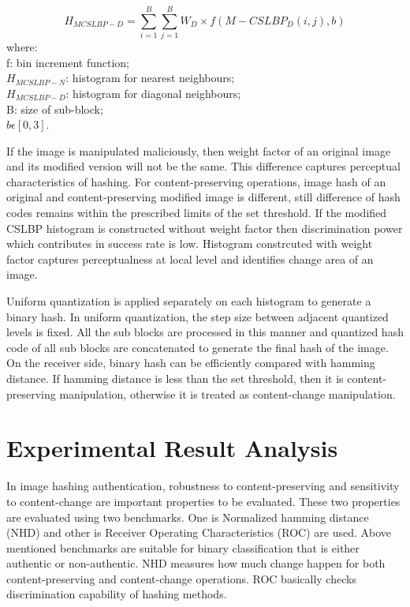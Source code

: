 \documentclass[12pt,a4paper]{jihmsp}
\begin{document}
{{\begin{equation}
H_{MCSLBP-D}=\sum_{i=1}^B\sum_{j=1}^BW_D \times f(M-CSLBP_{D}(i,j),b)
\end{equation}
where:\\
f: bin increment function;\\
$H_{MCSLBP-N}$: histogram for nearest neighbours; \\
$H_{MCSLBP-D}$: histogram for diagonal neighbours; \\
B: size of sub-block; \\
$b\epsilon[0,3]$. 
\par
If the image is manipulated maliciously, then weight factor of an original image and its modified version will not be the same. This difference captures perceptual characteristics of hashing. For content-preserving operations, image hash of an original and content-preserving modified image is different, still difference of hash codes remains within the prescribed limits of the set threshold. If the modified CSLBP histogram is constructed without weight factor then discrimination power which contributes in success rate is low. Histogram constrcuted with weight factor captures perceptualness at local level and identifies change area of an image.
\par
Uniform quantization is applied separately on each histogram to generate a binary hash. In uniform quantization, the step size between adjacent quantized levels is fixed. All the sub blocks are processed in this manner and quantized hash code of all sub blocks are concatenated to generate the final hash of the image. On the receiver side, binary hash can be efficiently compared with hamming distance. If hamming distance is less than the set threshold, then it is content-preserving manipulation, otherwise it is treated as content-change manipulation.

\section{Experimental Result Analysis}
In image hashing authentication, robustness to content-preserving and sensitivity to content-change are important properties to be evaluated. These two properties are evaluated using two benchmarks. One is Normalized hamming distance (NHD) and other is Receiver Operating Characteristics (ROC) are used. Above mentioned benchmarks are suitable for binary classification that is either authentic or non-authentic. NHD measures how much change happen for both content-preserving and content-change operations. ROC basically checks discrimination capability of hashing methods.

}}
\end{document}
